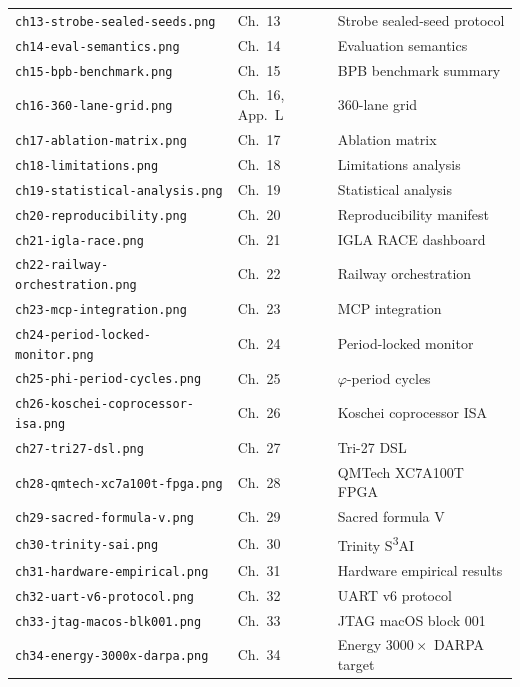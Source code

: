 \begin{longtable}{lll}
\texttt{ch13-strobe-sealed-seeds.png} &
  Ch.\ 13 & Strobe sealed-seed protocol \\
\texttt{ch14-eval-semantics.png} &
  Ch.\ 14 & Evaluation semantics \\
\texttt{ch15-bpb-benchmark.png} &
  Ch.\ 15 & BPB benchmark summary \\
\texttt{ch16-360-lane-grid.png} &
  Ch.\ 16, App.\ L & 360-lane grid \\
\texttt{ch17-ablation-matrix.png} &
  Ch.\ 17 & Ablation matrix \\
\texttt{ch18-limitations.png} &
  Ch.\ 18 & Limitations analysis \\
\texttt{ch19-statistical-analysis.png} &
  Ch.\ 19 & Statistical analysis \\
\texttt{ch20-reproducibility.png} &
  Ch.\ 20 & Reproducibility manifest \\
\texttt{ch21-igla-race.png} &
  Ch.\ 21 & IGLA RACE dashboard \\
\texttt{ch22-railway-orchestration.png} &
  Ch.\ 22 & Railway orchestration \\
\texttt{ch23-mcp-integration.png} &
  Ch.\ 23 & MCP integration \\
\texttt{ch24-period-locked-monitor.png} &
  Ch.\ 24 & Period-locked monitor \\
\texttt{ch25-phi-period-cycles.png} &
  Ch.\ 25 & $\varphi$-period cycles \\
\texttt{ch26-koschei-coprocessor-isa.png} &
  Ch.\ 26 & Koschei coprocessor ISA \\
\texttt{ch27-tri27-dsl.png} &
  Ch.\ 27 & Tri-27 DSL \\
\texttt{ch28-qmtech-xc7a100t-fpga.png} &
  Ch.\ 28 & QMTech XC7A100T FPGA \\
\texttt{ch29-sacred-formula-v.png} &
  Ch.\ 29 & Sacred formula V \\
\texttt{ch30-trinity-sai.png} &
  Ch.\ 30 & Trinity S\textsuperscript{3}AI \\
\texttt{ch31-hardware-empirical.png} &
  Ch.\ 31 & Hardware empirical results \\
\texttt{ch32-uart-v6-protocol.png} &
  Ch.\ 32 & UART v6 protocol \\
\texttt{ch33-jtag-macos-blk001.png} &
  Ch.\ 33 & JTAG macOS block 001 \\
\texttt{ch34-energy-3000x-darpa.png} &
  Ch.\ 34 & Energy $3000\times$ DARPA target \\
\end{longtable}

